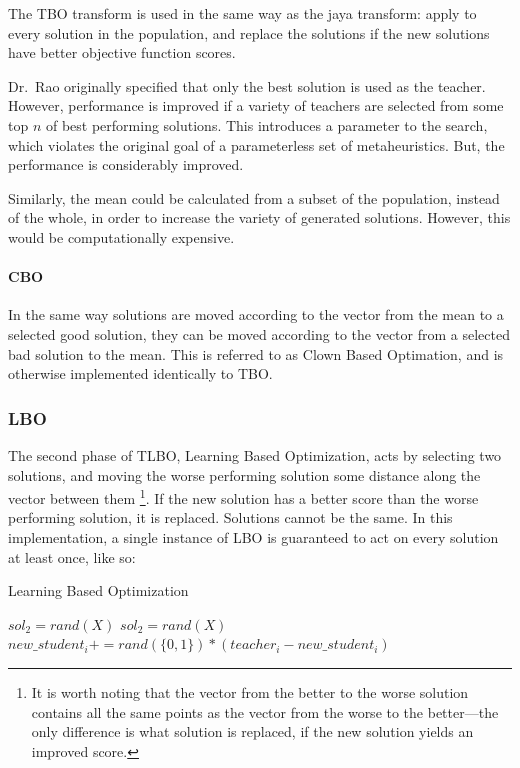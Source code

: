 \documentclass[11pt, letterpaper, onecolumn]{article}
\begin{document}
The TBO transform is used in the same way as the jaya transform: apply to every solution in the population, and replace the solutions if the new solutions have better objective function scores.

Dr.~Rao originally specified that only the best solution is used as the teacher. However, performance is improved if a variety of teachers are selected from some top $n$ of best performing solutions. This introduces a parameter to the search, which violates the original goal of a parameterless set of metaheuristics. But, the performance is considerably improved. 

Similarly, the mean could be calculated from a subset of the population, instead of the whole, in order to increase the variety of generated solutions. However, this would be computationally expensive. 

\paragraph{CBO}

In the same way solutions are moved according to the vector from the mean to a selected good solution, they can be moved according to the vector from a selected bad solution to the mean. This is referred to as Clown Based Optimation, and is otherwise implemented identically to TBO. 

\subsubsection{LBO}

The second phase of TLBO, Learning Based Optimization, acts by selecting two solutions, and moving the worse performing solution some distance along the vector between them \footnote{It is worth noting that the vector from the better to the worse solution contains all the same points as the vector from the worse to the better---the only difference is what solution is replaced, if the new solution yields an improved score.}. If the new solution has a better score than the worse performing solution, it is replaced. Solutions cannot be the same. In this implementation, a single instance of LBO is guaranteed to act on every solution at least once, like so:

\begin{algorithm}
\caption{Learning Based Optimization}
\begin{algorithmic}
\STATE $sol_2 = rand(X)$
\STATE $sol_2 = rand(X)$
\ENDWHILE
{}
\STATE $new\_student_i \mathrel{{+}{=}} rand(\{0,1\}) * (teacher_i - new\_student_i)$
\ENDFOR
{}
\ENDIF
\ENDFOR
\end{algorithmic}
\end{algorithm}
\end{document}
